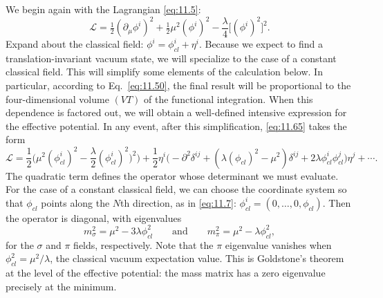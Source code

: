 We begin again with the Lagrangian \eqref{eq:11.5}:
\begin{equation}
  \mathcal{L} = \tfrac{1}{2}(\partial_\mu\phi^i)^2 + \tfrac{1}{2}\mu^2
    (\phi^i)^2 - \frac{\lambda}{4}\bigl[ (\phi^i)^2 \bigr]^2 .
  \label{eq:11.65}
\end{equation}
Expand about the classical field: $\phi^i = \phi^i_{cl} + \eta^i$.  Because we
expect to find a translation-invariant vacuum state, we will specialize to the
case of a constant classical field.  This will simplify some elements of the
calculation below.  In particular, according to Eq.~\eqref{eq:11.50}, the
final result will be proportional to the four-dimensional volume $(VT)$ of
the functional integration.  When this dependence is factored out, we will
obtain a well-defined intensive expression for the effective potential.  In
any event, after this simplification, \eqref{eq:11.65} takes the form
\begin{equation}
  \mathcal{L} = \frac{1}{2}\bigl( \mu^2(\phi^i_{cl})^2
    - \frac{\lambda}{2}(\phi^i_{cl})^2)^2 \bigr)
    + \frac{1}{2}\eta^i\bigl( -\partial^2\delta^{ij} + (\lambda(\phi_{cl})^2
      - \mu^2)\delta^{ij} + 2\lambda\phi^i_{cl}\phi^j_{cl} \bigr)\eta^j
    + \cdots .
  \label{eq:11.66}
\end{equation}
The quadratic term defines the operator whose determinant we must evaluate.
For the case of a constant classical field, we can choose the coordinate
system so that $\phi_{cl}$ points along the $N$th direction, as in
\eqref{eq:11.7}: $\phi^i_{cl} = (0, \ldots, 0, \phi_{cl})$.  Then the operator
is diagonal, with eigenvalues
\begin{equation}
  m^2_\sigma = \mu^2 - 3\lambda\phi_{cl}^2
  \qquad\text{and}\qquad
  m^2_\pi = \mu^2 - \lambda\phi_{cl}^2 ,
  \label{eq:11.69}
\end{equation}
for the $\sigma$ and $\pi$ fields, respectively.  Note that the $\pi$
eigenvalue vanishes when $\phi_{cl}^2 = \mu^2/\lambda$, the classical vacuum
expectation value.  This is Goldstone's theorem at the level of the effective
potential: the mass matrix has a zero eigenvalue precisely at the minimum.

